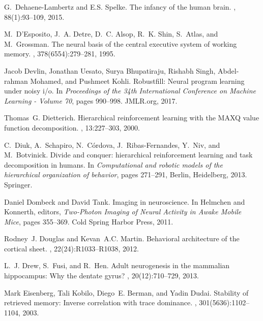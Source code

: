 \documentclass[letterpaper,11pt]{article}
\begin{document}
\begin{thebibliography}{100}
G.~Dehaene-Lambertz and E.S. Spelke.
\newblock The infancy of the human brain.
, 88(1):93--109, 2015.

M.~D'Esposito, J.~A. Detre, D.~C. Alsop, R.~K. Shin, S.~Atlas, and M.~Grossman.
\newblock The neural basis of the central executive system of working memory.
, 378(6554):279--281, 1995.

Jacob Devlin, Jonathan Uesato, Surya Bhupatiraju, Rishabh Singh, Abdel-rahman
  Mohamed, and Pushmeet Kohli.
\newblock Robustfill: Neural program learning under noisy i/o.
\newblock In {\em Proceedings of the 34th International Conference on Machine
  Learning - Volume 70}, pages 990--998. JMLR.org, 2017.

Thomas~G. Dietterich.
\newblock Hierarchical reinforcement learning with the {MAXQ} value function
  decomposition.
, 13:227--303, 2000.

C.~Diuk, A.~Schapiro, N.~C\'{o}rdova, J.~Ribas-Fernandes, Y.~Niv, and
  M.~Botvinick.
\newblock Divide and conquer: hierarchical reinforcement learning and task
  decomposition in humans.
\newblock In {\em Computational and robotic models of the hierarchical
  organization of behavior}, pages 271--291, Berlin, Heidelberg, 2013.
  Springer.

Daniel Dombeck and David Tank.
\newblock Imaging in neuroscience.
\newblock In Helmchen and Konnerth, editors, {\em Two-Photon Imaging of Neural
  Activity in Awake Mobile Mice}, pages 355--369. Cold Spring Harbor Press,
  2011.

Rodney~J. Douglas and Kevan~A.C. Martin.
\newblock Behavioral architecture of the cortical sheet.
, 22(24):R1033--R1038, 2012.

L.~J. Drew, S.~Fusi, and R.~Hen.
\newblock Adult neurogenesis in the mammalian hippocampus: {W}hy the dentate
  gyrus?
, 20(12):710--729, 2013.

Mark Eisenberg, Tali Kobilo, Diego~E. Berman, and Yadin Dudai.
\newblock Stability of retrieved memory: Inverse correlation with trace
  dominance.
, 301(5636):1102--1104, 2003.


\end{thebibliography}
\end{document}
